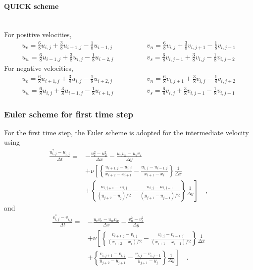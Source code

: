 \documentclass[12pt,a4paper,fleqn]{article}
\begin{document}
\paragraph{QUICK scheme}\mbox{}\\
For positive velocities,
\begin{equation*}
\begin{aligned}
u_e = \tfrac{6}{8}u_{i,j} + \tfrac{3}{8}u_{i+1,j} - \tfrac{1}{8}u_{i-1,j}\\
u_w = \tfrac{6}{8}u_{i-1,j} + \tfrac{3}{8}u_{i,j} - \tfrac{1}{8}u_{i-2,j}
\end{aligned}
\qquad\qquad
\begin{aligned}
v_n = \tfrac{6}{8}v_{i,j} + \tfrac{3}{8}v_{i,j+1} - \tfrac{1}{8}v_{i,j-1}\\
v_s = \tfrac{6}{8}v_{i,j-1} + \tfrac{3}{8}v_{i,j} - \tfrac{1}{8}v_{i,j-2}
\end{aligned}
\end{equation*}
For negative velocities,
\begin{equation*}
\begin{aligned}
u_e = \tfrac{6}{8}u_{i+1,j} + \tfrac{3}{8}u_{i,j} - \tfrac{1}{8}u_{i+2,j}\\
u_w = \tfrac{6}{8}u_{i,j} + \tfrac{3}{8}u_{i-1,j} - \tfrac{1}{8}u_{i+1,j}
\end{aligned}
\qquad\qquad
\begin{aligned}
v_n = \tfrac{6}{8}v_{i,j+1} + \tfrac{3}{8}v_{i,j} - \tfrac{1}{8}v_{i,j+2}\\
v_s = \tfrac{6}{8}v_{i,j} + \tfrac{3}{8}v_{i,j-1} - \tfrac{1}{8}v_{i,j+1}
\end{aligned}
\end{equation*}

\subsubsection{Euler scheme for first time step}
For the first time step, the Euler scheme is adopted for the intermediate velocity using
\begin{align}
\frac{u^*_{i,j}-u^{}_{i,j}}{\Delta t} =
{}& - \frac{u_e^2 - u_w^2}{\Delta x} - \frac{u_n v_n - u_s v_s}{\Delta y}
\nonumber \\
& + \nu\left[
\left\{
\frac{u_{i+1,j}-u_{i,j}}{x_{i+2}-x_{i+1}}
- \frac{u_{i,j}-u_{i-1,j}}{x_{i+1}-x_i}
\right\}
\frac{1}{\Delta x}
\right.
\nonumber\\
& \left. + \left\{
\frac{u_{i,j+1}-u_{i,j}}{(y_{j+2}-y_j)/2}
- \frac{u_{i,j}-u_{i,j-1}}{(y_{j+1}-y_{j-1})/2}
\right\}
\frac{1}{\Delta y}
\right] \quad ,
\label{eq:Euler-u}
\end{align}
and
\begin{align}
\frac{v^*_{i,j}-v^{}_{i,j}}{\Delta t} =
{}& - \frac{u_e v_e - u_w v_w}{\Delta x} - \frac{v_n^2 - v_s^2}{\Delta y} \nonumber\\
& + \nu\left[
\left\{
\frac{v_{i+1,j}-v_{i,j}}{(x_{i+2}-x_i)/2}
- \frac{v_{i,j}-v_{i-1,j}}{(x_{i+1}-x_{i-1})/2}
\right\}
\frac{1}{\Delta x}
\right.\nonumber\\
& \left. + \left\{
\frac{v_{i,j+1}-v_{i,j}}{y_{j+2}-y_{j+1}}
- \frac{v_{i,j}-v_{i,j-1}}{y_{j+1}-y_{j}}
\right\}
\frac{1}{\Delta y}
\right] \quad .
\label{eq:Euler-v}
\end{align}
\end{document}
